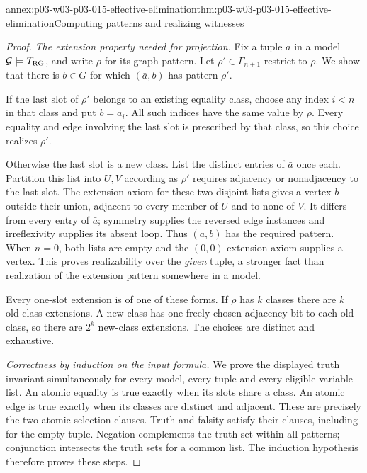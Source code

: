 \begin{annexitem}{annex:p03-w03-p03-015-effective-elimination}{thm:p03-w03-p03-015-effective-elimination}{Computing patterns and realizing witnesses}
\begin{proof}
\emph{The extension property needed for projection.}
Fix a tuple \(\bar a\) in a model \(\mathcal G\models T_{\rm RG}\),
and write \(\rho\) for its graph pattern. Let
\(\rho'\in\Gamma_{n+1}\) restrict to \(\rho\). We show that there
is \(b\in G\) for which \((\bar a,b)\) has pattern \(\rho'\).

If the last slot of \(\rho'\) belongs to an existing equality class,
choose any index \(i<n\) in that class and put \(b=a_i\). All such
indices have the same value by \(\rho\). Every equality and edge
involving the last slot is prescribed by that class, so this choice
realizes \(\rho'\).

Otherwise the last slot is a new class. List the distinct entries of
\(\bar a\) once each. Partition this list into \(U,V\) according as
\(\rho'\) requires adjacency or nonadjacency to the last slot. The
extension axiom for these two disjoint lists gives a vertex \(b\)
outside their union, adjacent to every member of \(U\) and to none of
\(V\). It differs from every entry of \(\bar a\); symmetry supplies
the reversed edge instances and irreflexivity supplies its absent loop.
Thus \((\bar a,b)\) has the required pattern. When \(n=0\), both
lists are empty and the \((0,0)\) extension axiom supplies a vertex.
This proves realizability over the \emph{given} tuple, a stronger fact
than realization of the extension pattern somewhere in a model.

Every one-slot extension is of one of these forms. If \(\rho\) has
\(k\) classes there are \(k\) old-class extensions. A new class has
one freely chosen adjacency bit to each old class, so there are
\(2^k\) new-class extensions. The choices are distinct and exhaustive.

\emph{Correctness by induction on the input formula.}
We prove the displayed truth invariant simultaneously for every model,
every tuple and every eligible variable list. An atomic equality is
true exactly when its slots share a class. An atomic edge is true
exactly when its classes are distinct and adjacent. These are precisely
the two atomic selection clauses. Truth and falsity satisfy their
clauses, including for the empty tuple. Negation complements the truth
set within all patterns; conjunction intersects the truth sets for a
common list. The induction hypothesis therefore proves these steps.


\end{proof}
\end{annexitem}
